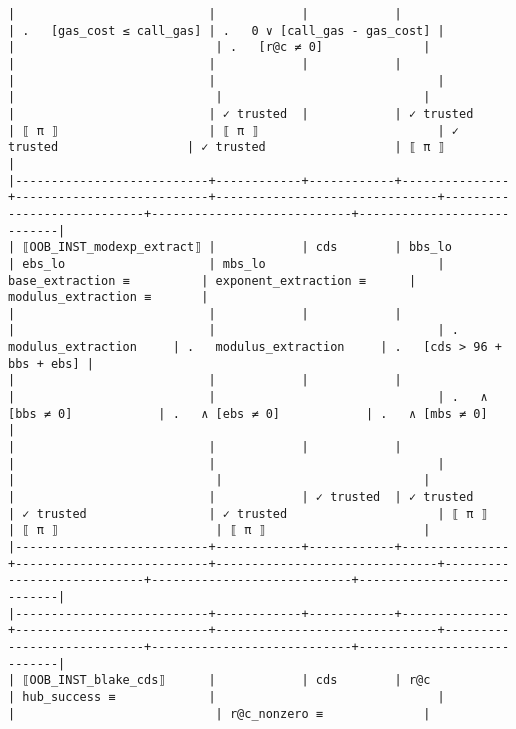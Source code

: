 \documentclass[varwidth=\maxdimen,margin=0.5cm,multi={verbatim}]{standalone}
\begin{document}
\begin{verbatim}
|                           |            |            |               | .   [gas_cost ≤ call_gas] | .   0 ∨ [call_gas - gas_cost] |                            |                            | .   [r@c ≠ 0]              |
|                           |            |            |               |                           |                               |                            |                            |                            |
|                           | ✓ trusted  |            | ✓ trusted     | ⟦ π ⟧                     | ⟦ π ⟧                         | ✓ trusted                  | ✓ trusted                  | ⟦ π ⟧                      |
|---------------------------+------------+------------+---------------+---------------------------+-------------------------------+----------------------------+----------------------------+----------------------------|
| ⟦OOB_INST_modexp_extract⟧ |            | cds        | bbs_lo        | ebs_lo                    | mbs_lo                        | base_extraction ≡          | exponent_extraction ≡      | modulus_extraction ≡       |
|                           |            |            |               |                           |                               | .   modulus_extraction     | .   modulus_extraction     | .   [cds > 96 + bbs + ebs] |
|                           |            |            |               |                           |                               | .   ∧ [bbs ≠ 0]            | .   ∧ [ebs ≠ 0]            | .   ∧ [mbs ≠ 0]            |
|                           |            |            |               |                           |                               |                            |                            |                            |
|                           |            | ✓ trusted  | ✓ trusted     | ✓ trusted                 | ✓ trusted                     | ⟦ π ⟧                      | ⟦ π ⟧                      | ⟦ π ⟧                      |
|---------------------------+------------+------------+---------------+---------------------------+-------------------------------+----------------------------+----------------------------+----------------------------|
|---------------------------+------------+------------+---------------+---------------------------+-------------------------------+----------------------------+----------------------------+----------------------------|
| ⟦OOB_INST_blake_cds⟧      |            | cds        | r@c           | hub_success ≡             |                               |                            |                            | r@c_nonzero ≡              |

\end{verbatim}
\end{document}

